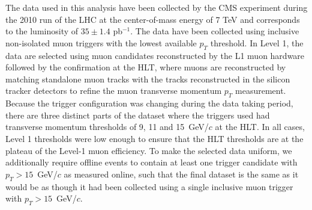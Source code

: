 The data used in this analysis have been collected by the CMS experiment during the 2010 run of the LHC at the center-of-mass energy of 7 TeV and corresponds to the luminosity of $35\pm1.4$ pb$^{-1}$. The data have been collected using inclusive non-isolated muon triggers with the lowest available $p_T$ threshold. In Level 1, the data are selected using muon candidates reconstructed by the L1 muon hardware followed by the confirmation at the HLT, where muons are reconstructed by matching standalone muon tracks with the tracks reconstructed in the silicon tracker detectors to refine the muon transverse momentum $p_T$ measurement. Because the trigger configuration was changing during the data taking period, there are three distinct parts of the dataset where the triggers used had transverse momentum thresholds of 9, 11 and 15~GeV/$c$ at the HLT. In all cases, Level 1 thresholds were low enough to ensure that the HLT thresholds are at the plateau of the Level-1 muon efficiency. To make the selected data uniform, we additionally require offline events to contain at least one trigger candidate with $p_T>15$~GeV/$c$ as measured online, such that the final dataset is the same as it would be as though it had been collected using a single inclusive muon trigger with $p_T>15$~GeV/$c$.
